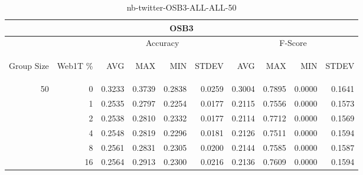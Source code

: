\begin{center}
\begin{table}[htbp]
\begin{center}
\begin{tabular}{ | r | r | r | r | r | r | r | r | r | r |}
\hline
\multicolumn{10}{|c|}{OSB3}\\
\hline
 & & \multicolumn{4}{|c|}{Accuracy} & \multicolumn{4}{|c|}{F-Score}\\ \cline{3-10}
\begin{sideways}Group Size\end{sideways} & \begin{sideways}Web1T \%\end{sideways} & \begin{sideways}AVG\end{sideways} & \begin{sideways}MAX\end{sideways} & \begin{sideways}MIN\end{sideways} & \begin{sideways}STDEV\end{sideways} & \begin{sideways}AVG\end{sideways} & \begin{sideways}MAX\end{sideways} & \begin{sideways}MIN\end{sideways} & \begin{sideways}STDEV\end{sideways}\\
\hline
\multirow{5}{*}{50}
 & 0 & 0.3233 & 0.3739 & 0.2838 & 0.0259 & 0.3004 & 0.7895 & 0.0000 & 0.1641\\ \cline{2-10}
 & 1 & 0.2535 & 0.2797 & 0.2254 & 0.0177 & 0.2115 & 0.7556 & 0.0000 & 0.1573\\ \cline{2-10}
 & 2 & 0.2538 & 0.2810 & 0.2332 & 0.0177 & 0.2114 & 0.7712 & 0.0000 & 0.1569\\ \cline{2-10}
 & 4 & 0.2548 & 0.2819 & 0.2296 & 0.0181 & 0.2126 & 0.7511 & 0.0000 & 0.1594\\ \cline{2-10}
 & 8 & 0.2561 & 0.2831 & 0.2305 & 0.0200 & 0.2144 & 0.7585 & 0.0000 & 0.1587\\ \cline{2-10}
 & 16 & 0.2564 & 0.2913 & 0.2300 & 0.0216 & 0.2136 & 0.7609 & 0.0000 & 0.1594\\ \cline{2-10}
\hline
\end{tabular}
\caption{nb-twitter-OSB3-ALL-ALL-50}
\label{table:nb-twitter-OSB3-ALL-ALL-50}
\end{center}
\end{table}
\end{center}

